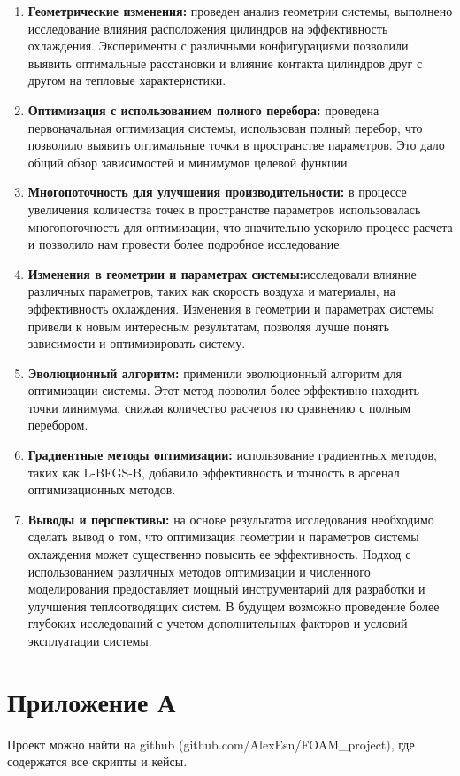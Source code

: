 \documentclass[a4paper,12pt]{article}
\theoremstyle{plain} %
\theoremstyle{definition} %
\theoremstyle{remark} %
\begin{document}
\begin{enumerate}
	\item \textbf{Геометрические изменения:} проведен анализ геометрии системы, выполнено исследование влияния расположения цилиндров на эффективность охлаждения. Эксперименты с различными конфигурациями позволили выявить оптимальные расстановки и влияние контакта цилиндров друг с другом на тепловые характеристики.
	      
	\item \textbf{Оптимизация с использованием полного перебора:} проведена первоначальная оптимизация системы, использован полный перебор, что позволило выявить оптимальные точки в пространстве параметров. Это дало общий обзор зависимостей и минимумов целевой функции.
	      
	\item \textbf{Многопоточность для улучшения производительности:} в процессе увеличения количества точек в пространстве параметров использовалась многопоточность для оптимизации, что значительно ускорило процесс расчета и позволило нам провести более подробное исследование.
	      
	\item \textbf{Изменения в геометрии и параметрах системы:}исследовали влияние различных параметров, таких как скорость воздуха и материалы, на эффективность охлаждения. Изменения в геометрии и параметрах системы привели к новым интересным результатам, позволяя лучше понять зависимости и оптимизировать систему.
	      
	\item \textbf{Эволюционный алгоритм:} применили эволюционный алгоритм для оптимизации системы. Этот метод позволил более эффективно находить точки минимума, снижая количество расчетов по сравнению с полным перебором.
	      
	\item \textbf{Градиентные методы оптимизации:} использование градиентных методов, таких как L-BFGS-B, добавило эффективность и точность в арсенал оптимизационных методов.
	      
	\item \textbf{Выводы и перспективы:} на основе результатов исследования необходимо сделать вывод о том, что оптимизация геометрии и параметров системы охлаждения может существенно повысить ее эффективность. Подход с использованием различных методов оптимизации и численного моделирования предоставляет мощный инструментарий для разработки и улучшения теплоотводящих систем. В будущем возможно проведение более глубоких исследований с учетом дополнительных факторов и условий эксплуатации системы.
\end{enumerate}

\newpage

\newpage
\section*{Приложение А}
Проект можно найти на github (github.com/AlexEsn/FOAM\_project), где содержатся все скрипты и кейсы.
\end{document}
